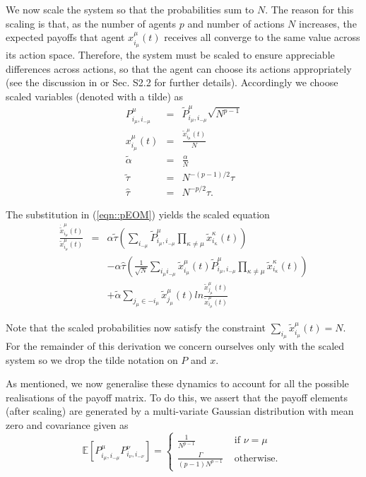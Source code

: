 \documentclass[sigconf,anonymous]{aamas}
\newcommand{\xmu}[2]{x_{#1_#2}^{#2}(t)}
\newcommand{\payoff}[2]{P^{#2}_{#1_#2, #1_{-#2}}}
\newcommand{\txmu}[2]{\tilde{x}_{#1_#2}^{#2}(t)}
\newcommand{\dtxmu}[2]{\dot{\tilde{x}}_{#1_#2}^{#2}(t)}
\newcommand{\tpayoff}[2]{\tilde{P}^{#2}_{#1_#2, #1_{-#2}}}
\newcommand{\talpha}{\tilde{\alpha}}
\newcommand{\ttau}{\tilde{\tau}}
\newcommand{\htau}{\hat{\tau}}
\begin{document}
We now scale the system so that the probabilities sum to $N$. The
reason for this scaling is that, as the number of agents $p$ and
number of actions $N$ increases, the expected payoffs that agent
$\xmu{i}{\mu}$ receives all converge to the same value across its action
space. Therefore, the system must be scaled to ensure appreciable
differences across actions, so that the agent can choose its actions
appropriately (see the discussion in \cite{Sanders2018} or
Sec. S2.2 for further details). Accordingly we choose
scaled variables (denoted with a tilde) as
%
\begin{eqnarray*}
        \payoff{i}{\mu} & = & \tpayoff{i}{\mu} \sqrt{N^{p-1}}\\
        \xmu{i}{\mu} & = & \frac{\txmu{i}{\mu}}{N} \\
        \talpha & = & \frac{\alpha}{N} \\
        \ttau & = & N^{-(p-1)/2} \tau \\
        \htau & = & N^{-p/2} \tau.
\end{eqnarray*}

The substitution in (\ref{eqn::pEOM}) yields the scaled equation
%
\begin{eqnarray}
    \frac{\dtxmu{i}{\mu}}{\txmu{i}{\mu}} & = & \alpha \ttau \left ( \sum_{i_{-\mu}} \tpayoff{i}{\mu} \prod_{\kappa \neq \mu} \txmu{i}{\kappa} \right ) \nonumber \\ & &  - \alpha \htau \left ( \frac{1}{\sqrt{N}} \sum_{i_\mu i_{-\mu}} \txmu{i}{\mu} \tpayoff{i}{\mu} \prod_{\kappa \neq \mu} \txmu{i}{\kappa} \right ) \nonumber  \\  & & + \talpha \sum_{j_\mu \in -i_\mu} \txmu{j}{\mu} ln \frac{\txmu{j}{\mu}}{\txmu{i}{\mu}}    \label{eqn::scaledEOM}
\end{eqnarray}

Note that the scaled probabilities now satisfy the constraint
$\sum_{i_\mu} \txmu{i}{\mu} = N$. For the remainder of this derivation
we concern ourselves only with the scaled system so we drop the tilde
notation on $P$ and $x$.

As mentioned, we now
generalise these dynamics to account for all the possible realisations
of the payoff matrix. To do this, we assert that the payoff elements
(after scaling) are generated by a multi-variate Gaussian distribution
with mean zero and covariance given as
%
\begin{equation}
\label{eqn::Payoffs}
        \mathbb{E}\left [ \payoff{i}{\mu} \payoff{i}{\nu} \right] = \begin{cases}
        \frac{1}{N^{p-1}} &  \text{ if } \nu = \mu \\
        \frac{\Gamma}{(p-1) N^{p-1}} & \text{ otherwise. }
        \end{cases}
\end{equation}
\end{document}
